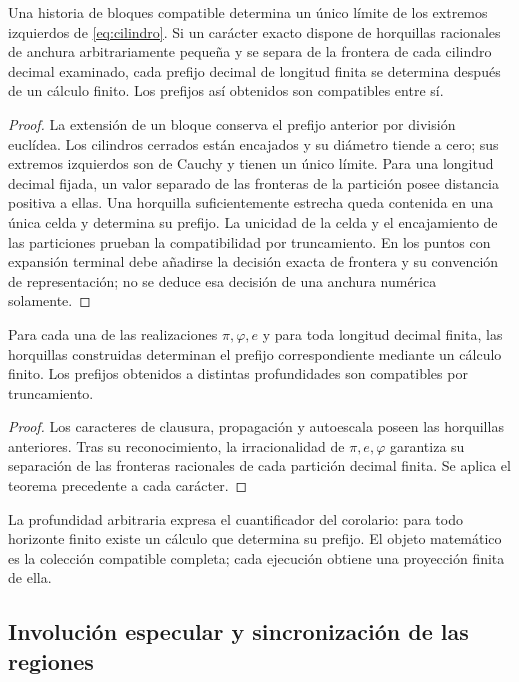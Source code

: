 \begin{theorem}
Una historia de bloques compatible determina un único límite de los extremos izquierdos de \eqref{eq:cilindro}. Si un carácter exacto dispone de horquillas racionales de anchura arbitrariamente pequeña y se separa de la frontera de cada cilindro decimal examinado, cada prefijo decimal de longitud finita se determina después de un cálculo finito. Los prefijos así obtenidos son compatibles entre sí.
\end{theorem}
\begin{proof}
La extensión de un bloque conserva el prefijo anterior por división euclídea. Los cilindros cerrados están encajados y su diámetro tiende a cero; sus extremos izquierdos son de Cauchy y tienen un único límite. Para una longitud decimal fijada, un valor separado de las fronteras de la partición posee distancia positiva a ellas. Una horquilla suficientemente estrecha queda contenida en una única celda y determina su prefijo. La unicidad de la celda y el encajamiento de las particiones prueban la compatibilidad por truncamiento. En los puntos con expansión terminal debe añadirse la decisión exacta de frontera y su convención de representación; no se deduce esa decisión de una anchura numérica solamente.
\end{proof}

\begin{corollary}
\label{gen:prefijos-regionales}
Para cada una de las realizaciones \(\pi,\varphi,e\) y para toda longitud
decimal finita, las horquillas construidas determinan el prefijo correspondiente
mediante un cálculo finito. Los prefijos obtenidos a distintas profundidades
son compatibles por truncamiento.
\end{corollary}
\begin{proof}
Los caracteres de clausura, propagación y autoescala poseen las horquillas
anteriores. Tras su reconocimiento, la irracionalidad de \(\pi,e,\varphi\)
garantiza su separación de las fronteras racionales de cada partición decimal
finita. Se aplica el teorema precedente a cada carácter.
\end{proof}
La profundidad arbitraria expresa el cuantificador del corolario: para todo
horizonte finito existe un cálculo que determina su prefijo. El objeto
matemático es la colección compatible completa; cada ejecución obtiene una
proyección finita de ella.

\subsection{Involución especular y sincronización de las regiones}

